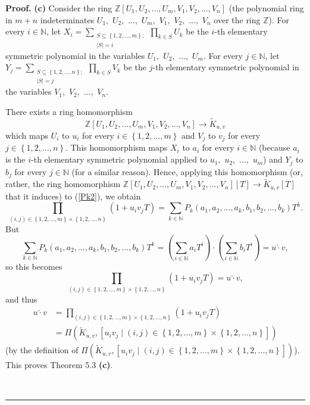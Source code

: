 \documentclass[numbers=enddot,12pt,final,onecolumn,notitlepage]{scrartcl}%
\newenvironment{proof}[1][Proof]{\noindent\textbf{#1.} }{\ \rule{0.5em}{0.5em}}
\begin{document}
\begin{proof}
\textbf{(c)} Consider the ring $\mathbb{Z}\left[  U_{1},U_{2},...,U_{m}%
,V_{1},V_{2},...,V_{n}\right]  $ (the polynomial ring in $m+n$ indeterminates
$U_{1},$ $U_{2},$ $...,$ $U_{m},$ $V_{1},$ $V_{2},$ $...,$ $V_{n}$ over the
ring $\mathbb{Z}$). For every $i\in\mathbb{N}$, let $X_{i}=\sum
\limits_{\substack{S\subseteq\left\{  1,2,...,m\right\}  ;\\\left\vert
S\right\vert =i}}\prod\limits_{k\in S}U_{k}$ be the $i$-th elementary
symmetric polynomial in the variables $U_{1},$ $U_{2},$ $...,$ $U_{m}$. For
every $j\in\mathbb{N}$, let $Y_{j}=\sum\limits_{\substack{S\subseteq\left\{
1,2,...,n\right\}  ;\\\left\vert S\right\vert =j}}\prod\limits_{k\in S}V_{k}$
be the $j$-th elementary symmetric polynomial in the variables $V_{1},$
$V_{2},$ $...,$ $V_{n}$.

There exists a ring homomorphism%
\[
\mathbb{Z}\left[  U_{1},U_{2},...,U_{m},V_{1},V_{2},...,V_{n}\right]
\rightarrow\widetilde{K}_{u,v}%
\]
which maps $U_{i}$ to $u_{i}$ for every $i\in\left\{  1,2,\ldots,m\right\}  $
and $V_{j}$ to $v_{j}$ for every $j\in\left\{  1,2,\ldots,n\right\}  $. This
homomorphism maps $X_{i}$ to $a_{i}$ for every $i\in\mathbb{N}$ (because
$a_{i}$ is the $i$-th elementary symmetric polynomial applied to $u_{1},$
$u_{2},$ $...,$ $u_{m}$) and $Y_{j}$ to $b_{j}$ for every $j\in\mathbb{N}$
(for a similar reason). Hence, applying this homomorphism (or, rather, the
ring homomorphism $\mathbb{Z}\left[  U_{1},U_{2},...,U_{m},V_{1}%
,V_{2},...,V_{n}\right]  \left[  T\right]  \rightarrow\widetilde{K}%
_{u,v}\left[  T\right]  $ that it induces) to (\ref{Pk2}), we obtain%
\[
\prod_{\left(  i,j\right)  \in\left\{  1,2,...,m\right\}  \times\left\{
1,2,...,n\right\}  }\left(  1+u_{i}v_{j}T\right)  =\sum_{k\in\mathbb{N}}%
P_{k}\left(  a_{1},a_{2},...,a_{k},b_{1},b_{2},...,b_{k}\right)  T^{k}.
\]
But%
\[
\sum_{k\in\mathbb{N}}P_{k}\left(  a_{1},a_{2},...,a_{k},b_{1},b_{2}%
,...,b_{k}\right)  T^{k}=\left(  \sum_{i\in\mathbb{N}}a_{i}T^{i}\right)
\widehat{\cdot}\left(  \sum_{i\in\mathbb{N}}b_{i}T^{i}\right)
=u\widehat{\cdot}v,
\]
so this becomes%
\[
\prod_{\left(  i,j\right)  \in\left\{  1,2,...,m\right\}  \times\left\{
1,2,...,n\right\}  }\left(  1+u_{i}v_{j}T\right)  =u\widehat{\cdot}v,
\]
and thus%
\begin{align*}
u\widehat{\cdot}v  &  =\prod_{\left(  i,j\right)  \in\left\{
1,2,...,m\right\}  \times\left\{  1,2,...,n\right\}  }\left(  1+u_{i}%
v_{j}T\right) \\
&  =\Pi\left(  \widetilde{K}_{u,v},\left[  u_{i}v_{j}\mid\left(  i,j\right)
\in\left\{  1,2,...,m\right\}  \times\left\{  1,2,...,n\right\}  \right]
\right)
\end{align*}
(by the definition of $\Pi\left(  \widetilde{K}_{u,v},\left[  u_{i}v_{j}%
\mid\left(  i,j\right)  \in\left\{  1,2,...,m\right\}  \times\left\{
1,2,...,n\right\}  \right]  \right)  $). This proves Theorem 5.3 \textbf{(c)}.


\end{proof}
\end{document}
